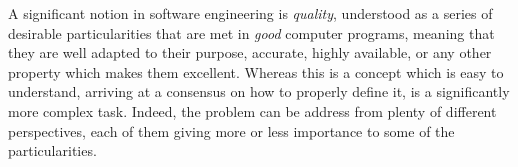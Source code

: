 

A significant notion in software engineering is \textit{quality}, understood as a series of desirable particularities that are met in \textit{good} computer programs, meaning that they are well adapted to their purpose, accurate, highly available, or any other property which makes them excellent.
Whereas this is a concept which is easy to understand, arriving at a consensus on how to properly define it, is a significantly more complex task. Indeed, the problem can be address from plenty of different perspectives, each of them giving more or less importance to some of the particularities.

